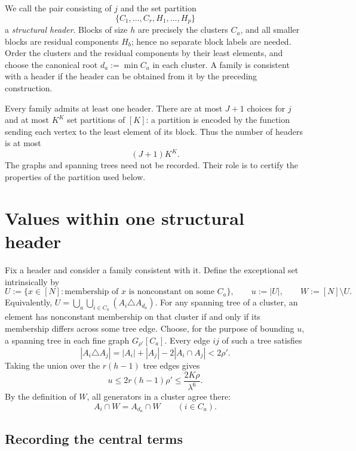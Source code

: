 \documentclass[11pt]{article}
\theoremstyle{definition}
\theoremstyle{remark}
\newcommand{\defterm}[1]{\emph{#1}}
\begin{document}
We call the pair consisting of $j$ and the set partition
\[
  \{C_1,\ldots,C_r,H_1,\ldots,H_p\}
\]
a \defterm{structural header}. Blocks of size $h$ are precisely the
clusters $C_a$, and all smaller blocks are residual components $H_b$; hence
no separate block labels are needed. Order the clusters and the residual
components by their least elements, and choose the canonical root
$d_a:=\min C_a$ in each cluster. A family is consistent with a header if the
header can be obtained from it by the preceding construction.

Every family admits at least one header. There are at most $J+1$ choices
for $j$ and at most $K^K$ set partitions of $[K]$: a partition is encoded by
the function sending each vertex to the least element of its block. Thus
the number of headers is at most
\begin{equation}
  (J+1)K^K.
  \label{eq:header-count}
\end{equation}
The graphs and spanning trees need not be recorded. Their role is to
certify the properties of the partition used below.

\section{Values within one structural header}\label{sec:fixed-header}

Fix a header and consider a family consistent with it. Define the
exceptional set intrinsically by
\[
  U:=\{x\in[N]:\text{membership of }x\text{ is nonconstant on some }C_a\},
  \qquad u:=|U|,\qquad W:=[N]\setminus U.
\]
Equivalently,
$U=\bigcup_a\bigcup_{i\in C_a}(A_i\triangle A_{d_a})$.
For any spanning tree of a cluster, an element has nonconstant membership
on that cluster if and only if its membership differs across some tree
edge. Choose, for the purpose of bounding $u$, a spanning tree in each fine
graph $G_{\rho'}[C_a]$. Every edge $ij$ of such a tree satisfies
\[
  |A_i\triangle A_j|
  =|A_i|+|A_j|-2|A_i\cap A_j|<2\rho'.
\]
Taking the union over the $r(h-1)$ tree edges gives
\begin{equation}
  u\le2r(h-1)\rho'\le\frac{2K\rho}{\lambda^6}.
  \label{eq:u-bound}
\end{equation}
By the definition of $W$, all generators in a cluster agree there:
\begin{equation}
  A_i\cap W=A_{d_a}\cap W\qquad(i\in C_a).
  \label{eq:cluster-agreement}
\end{equation}

\subsection{Recording the central terms}
\end{document}
